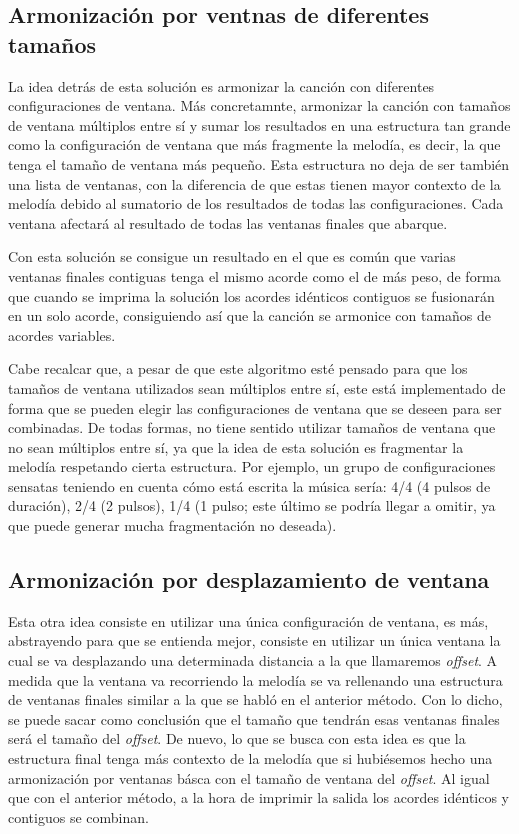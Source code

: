\subsection{Armonización por ventnas de diferentes tamaños}\label{arm:subsubsec:ventanas_diferentes}

La idea detrás de esta solución es armonizar la canción con diferentes configuraciones de ventana. Más concretamnte, armonizar la canción con tamaños de ventana múltiplos entre sí y sumar los resultados en una estructura tan grande como la configuración de ventana que más fragmente la melodía, es decir, la que tenga el tamaño de ventana más pequeño. Esta estructura no deja de ser también una lista de ventanas, con la diferencia de que estas tienen mayor contexto de la melodía debido al sumatorio de los resultados de todas las configuraciones. Cada ventana afectará al resultado de todas las ventanas finales que abarque. 

Con esta solución se consigue un resultado en el que es común que varias ventanas finales contiguas tenga el mismo acorde como el de más peso, de forma que cuando se imprima la solución los acordes idénticos contiguos se fusionarán en un solo acorde, consiguiendo así que la canción se armonice con tamaños de acordes variables. 

Cabe recalcar que, a pesar de que este algoritmo esté pensado para que los tamaños de ventana utilizados sean múltiplos entre sí, este está implementado de forma que se pueden elegir las configuraciones de ventana que se deseen para ser combinadas. De todas formas, no tiene sentido utilizar tamaños de ventana que no sean múltiplos entre sí, ya que la idea de esta solución es fragmentar la melodía respetando cierta estructura. Por ejemplo, un grupo de configuraciones sensatas teniendo en cuenta cómo está escrita la música sería: 4/4 (4 pulsos de duración), 2/4 (2 pulsos), 1/4 (1 pulso; este último se podría llegar a omitir, ya que puede generar mucha fragmentación no deseada).

\subsection{Armonización por desplazamiento de ventana}
\label{arm:subsubsec:desplazamiento_ventanas}

Esta otra idea consiste en utilizar una única configuración de ventana, es más, abstrayendo para que se entienda mejor, consiste en utilizar un única ventana la cual se va desplazando una determinada distancia a la que llamaremos \textit{offset}. A medida que la ventana va recorriendo la melodía se va rellenando una estructura de ventanas finales similar a la que se habló en el anterior método. Con lo dicho, se puede sacar como conclusión que el tamaño que tendrán esas ventanas finales será el tamaño del \textit{offset}. De nuevo, lo que se busca con esta idea es que la estructura final tenga más contexto de la melodía que si hubiésemos hecho una armonización por ventanas básca con el tamaño de ventana del \textit{offset}. Al igual que con el anterior método, a la hora de imprimir la salida los acordes idénticos y contiguos se combinan.

